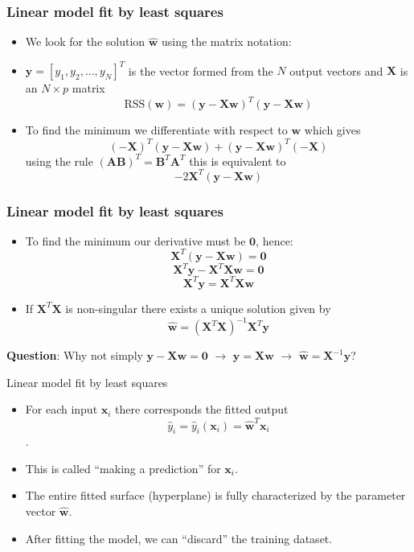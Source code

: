 \documentclass[notes]{beamer}          %
\newcommand{\vect}[1]{\bm{#1}}
\begin{document}
\begin{frame}
\frametitle{Linear model fit by least squares}
    \begin{itemize}
        \item We look for the solution $\hat{\vect{w}}$ using the matrix notation:
        \item $\vect{y} = [y_1, y_2, \ldots, y_N]^T$ is the vector formed from the $N$ output vectors and $\vect{X}$ is an $N \times p$ matrix  \\
        $$\mbox{RSS}(\vect{w}) =  (\vect{y} - \vect{X} \vect{w})^T (\vect{y} - \vect{X} \vect{w})$$
        \item To find the minimum we differentiate with respect to $\vect{w}$ which gives
        $$(-\vect{X})^T(\vect{y}-\vect{X}\vect{w}) + (\vect{y}-\vect{X}\vect{w})^T (-\vect{X})$$
        using the rule $(\vect{A}\vect{B})^T = \vect{B}^T\vect{A}^T$ this is equivalent to
        $$ -2 \vect{X}^T(\vect{y}-\vect{X}\vect{w})$$
    \end{itemize}
\end{frame}

\begin{frame}
\frametitle{Linear model fit by least squares}
    \begin{itemize}

    \item To find the minimum our derivative must be $\vect{0}$, hence:
        $$\vect{X}^T(\vect{y}-\vect{X}\vect{w}) =  \vect{0}$$
        $$\vect{X}^T \vect{y} -\vect{X}^T\vect{X}\vect{w} =  \vect{0}$$
        $$ \vect{X}^T \vect{y} = \vect{X}^T\vect{X}\vect{w}$$
    \item    If $\vect{X}^T\vect{X}$ is non-singular there exists a unique solution given by
        $$\hat{\vect{w}} = (\vect{X}^T\vect{X})^{-1}\vect{X}^T \vect{y}$$
    \end{itemize}

         {\bf Question}: Why not simply $\vect{y} -\vect{X}\vect{w}=  \vect{0}$ $\rightarrow$ $\vect{y} = \vect{X}\vect{w}$ $\rightarrow$ $\hat{\vect{w}} = \vect{X}^{-1} \vect{y}$?

\end{frame}


\begin{frame}{Linear model fit by least squares}
    \begin{itemize}
        \item For each input $\vect{x}_i$ there corresponds the fitted output $$\hat{y}_i = \hat{y}_i(\vect{x}_i) = \hat{\vect{w}}^T\vect{x}_i$$.
        \item This is called ``making a prediction'' for $\vect{x}_i$.

        \item The entire fitted surface (hyperplane) is fully characterized by the parameter vector $\hat{\vect{w}}$.

        \item After fitting the model, we can ``discard'' the training dataset.
    \end{itemize}
\end{frame}
\end{document}
